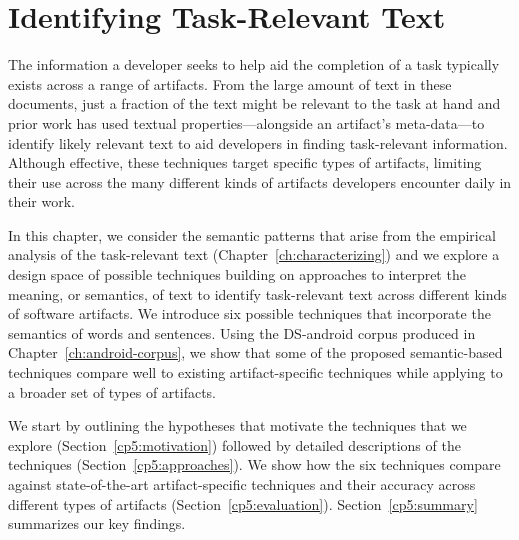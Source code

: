 \setcounter{chapter}{4}


\chapter{Identifying Task-Relevant Text}
\label{ch:identifying}

The information a developer seeks to help aid the completion of a task typically exists
across a range of artifacts. 
From the large amount of text
in these documents, just a fraction of the text might be relevant
to the task at hand and prior work has used textual properties---alongside an artifact's meta-data---to
 identify likely relevant text to aid developers in finding task-relevant information.
Although effective, these techniques target specific
types of artifacts, limiting their use across the 
many different kinds of artifacts developers encounter
daily in their work.



In this chapter, we consider the 
semantic patterns that arise from the empirical analysis of the task-relevant text (Chapter~\ref{ch:characterizing})
and we explore a design space of possible techniques building on approaches to interpret the meaning, or semantics, of text
to identify task-relevant text across different kinds of software artifacts.
We introduce six possible techniques that incorporate the  
semantics of words and sentences. 
Using the \acs{DS-android} corpus produced in Chapter~\ref{ch:android-corpus},
we show that some of the proposed semantic-based techniques 
compare well to existing artifact-specific techniques 
while applying to a broader set of types of artifacts.





We start by outlining the hypotheses that motivate the techniques that we explore (Section~\ref{cp5:motivation}) followed by detailed descriptions of the
techniques (Section~\ref{cp5:approaches}).
We show how the six techniques 
compare against state-of-the-art artifact-specific techniques and 
their accuracy across different types of artifacts (Section~\ref{cp5:evaluation}). 
Section~\ref{cp5:summary} summarizes our key findings.











